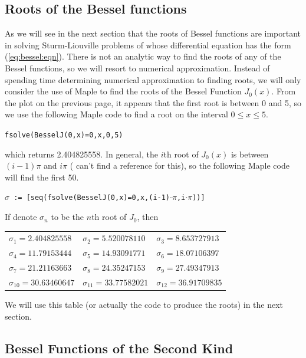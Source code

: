 \subsection{Roots of the Bessel functions}

As we will see in the next section that the roots of Bessel functions are important in solving Sturm-Liouville problems of whose differential equation has the form (\ref{eq:bessel:eqn}).  
There is not an analytic way to find the roots of any of the Bessel functions, so we will resort to numerical approximation.  Instead of spending time determining numerical approximation to finding roots, we will only consider the use of Maple to find the roots of the Bessel Function $J_0(x)$.  From the plot on the previous page, it appears that the first root is between 0 and 5, so we use the following Maple code to find a root on the interval $0 \leq x \leq 5$. 
%
\begin{center}
\texttt{fsolve(BesselJ(0,x)=0,x,0,5)}
\end{center}
which returns 2.404825558.  In general, the $i$th root of $J_0(x)$ is between $(i-1)\pi$ and $i\pi$ ({\color{red} can't find a reference for this}), so the following Maple code will find the first 50. 

\begin{center}
\texttt{$\sigma$ := [seq(fsolve(BesselJ(0,x)=0,x,(i-1)$\cdot\pi$,i$\cdot\pi$))]}
\end{center}
%
If denote $\sigma_n$ to be the $n$th root of $J_0$, then 
%
\begin{center}
\begin{tabular}{lll}
$\sigma_1 = 2.404825558$ & $\sigma_2 = 5.520078110$ & $\sigma_3 = 8.653727913$ \\
$\sigma_4= 11.79153444$ & $\sigma_5 = 14.93091771$ & $\sigma_6 = 18.07106397$ \\
$\sigma_7= 21.21163663$ & $\sigma_8 = 24.35247153$ & $\sigma_9 =  27.49347913$ \\
$\sigma_{10} =30.63460647$ & $\sigma_{11} = 33.77582021$ & $\sigma_{12} = 36.91709835$ 
\end{tabular}
\end{center}

We will use this table (or actually the code to produce the roots) in the next section.  


\subsection{Bessel Functions of the Second Kind}

